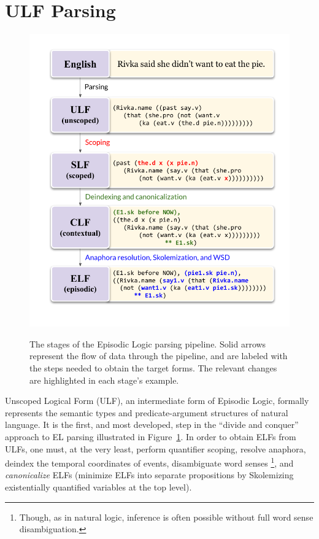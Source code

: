 \section{ULF Parsing}

\begin{figure}
\centering
\includegraphics[width=\columnwidth]{CH2_el/el_pipeline.pdf}
\label{fig:el_pipeline}
\caption{The stages of the Episodic Logic parsing pipeline. Solid arrows represent the flow of data through the pipeline, and are labeled with the steps needed to obtain the target forms. The relevant changes are highlighted in each stage's example.}
\end{figure}

\label{subsec:ulf}
Unscoped Logical Form (ULF), an intermediate form of Episodic Logic, formally represents the semantic types and predicate-argument structures of natural language. It is the first, and most developed, step in the ``divide and conquer'' approach to EL parsing illustrated in Figure~\ref{fig:el_pipeline}. In order to obtain ELFs from ULFs, one must, at the very least, perform quantifier scoping, resolve anaphora, deindex the temporal coordinates of events, disambiguate word senses \footnote{Though, as in natural logic, inference is often possible without full word sense disambiguation.}, and \textit{canonicalize} ELFs (minimize ELFs into separate propositions by Skolemizing existentially quantified variables at the top level).

